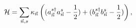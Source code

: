 \begin{equation}
\label{hamiltonian0}
{\cal H} = \sum_{{\vec n},s} \kappa_{\vec n} \left( 
(a^{s\dagger}_{\vec n} a^{s}_{\vec n}-\frac{1}{2}) + 
(b^{s\dagger}_{\vec n} b^{s}_{\vec n}-\frac{1}{2}) \right), 
\end{equation}

